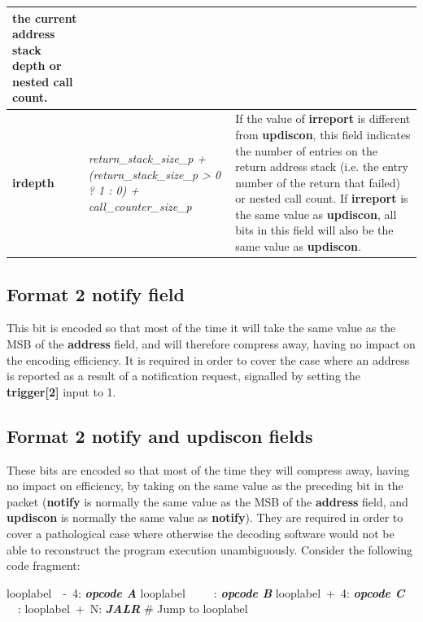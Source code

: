 \begin{table}[!h]
\begin{tabulary}{\textwidth}{|l|p{35mm}|p{90mm}|}
                the current address stack depth or nested call count. \\
    \hline
    \textbf{irdepth}	& \textit {return\_stack\_size\_p + (return\_stack\_size\_p > 0 ? 1 : 0) + call\_counter\_size\_p} & 
                If the value of \textbf{irreport} is different from \textbf{updiscon}, this field 
		indicates the number of entries on the return address stack (i.e. the entry number of the return that
                failed) or nested call count.  If \textbf{irreport} is the same value as \textbf{updiscon}, 
                all bits in this field  will also be the same value as \textbf{updiscon}. \\
    \hline
  \end{tabulary}
\end{table}

\subsection{Format 2 \textbf{notify} field} \label{sec:notify}

This bit is encoded so that most of the time it will take the same value as the MSB of the \textbf{address} field,
and will therefore compress away, having no impact on the encoding efficiency.  It is required in order to cover 
the case where an address is reported as a result of a notification request, signalled by setting the 
\textbf{trigger[2]} input to 1. 


\subsection{Format 2 \textbf{notify} and \textbf{updiscon} fields} \label{sec:updiscon}

These bits are encoded so that most of the time they will compress away, having no impact on efficiency, by taking on 
the same value as the preceding bit in the packet (\textbf{notify} is normally the same value as the MSB of the 
\textbf{address} field, and \textbf{updiscon} is normally the same value as \textbf{notify}).  They are required in
order to cover a pathological case where otherwise the decoding software would not be able to reconstruct the program 
execution unambiguously. Consider the following code fragment:

looplabel~~-~4: \textbf{\textit{opcode A}} \newline
looplabel~~~~~: \textbf{\textit{opcode B}} \newline
looplabel~+~4: \textbf{\textit{opcode C}} \newline
~~: \newline
looplabel~+~N: \textbf{\textit{JALR}} \# Jump to looplabel\newline

